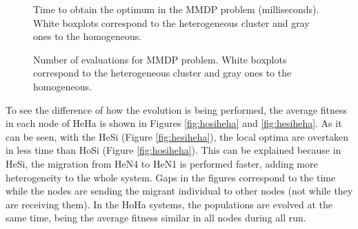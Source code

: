 




\begin{figure}
\centering
{}
\caption{Time to obtain the optimum in the MMDP problem (milliseconds). White boxplots correspond to the heterogeneous cluster and gray ones to the homogeneous.}
\label{fig:timeMMDP}
\end{figure}

\begin{figure}
\centering
{}
\caption{Number of evaluations for MMDP problem. White boxplots correspond to the heterogeneous cluster and gray ones to the homogeneous.}
\label{fig:evalsMMDP}
\end{figure}

To see the difference of how the evolution is being performed, the average fitness in each node of HeHa is shown in Figures \ref{fig:hosiheha} and \ref{fig:hesiheha}. As it can be seen, with the HeSi (Figure \ref{fig:hesiheha}), the local optima are overtaken in less time than HoSi (Figure \ref{fig:hosiheha}).  This can be explained because in HeSi, the migration from HeN4 to HeN1 is performed faster, adding more heterogeneity to the whole system. Gaps in the figures correspond to the time while the nodes are sending the migrant individual to other nodes (not while they are receiving them). In the HoHa systems, the populations are evolved at the same time, being the average fitness similar in all nodes during all run. %


\begin{figure*}
\centering
{}
\caption{Average fitness in the first 1000 milliseconds of execution of the four nodes of the heterogeneous cluster with the same population sizes (HoSi/HeHa) for the MMDP problem.}
\label{fig:hosiheha}
\end{figure*}

